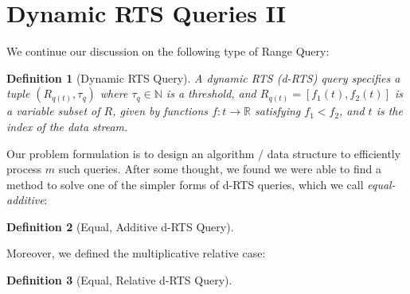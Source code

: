 \documentclass{article}
\newtheorem{definition}{Definition}
\begin{document}
\hspace{95mm}

\section*{Dynamic RTS Queries II}

We continue our discussion on the following type of Range Query: 

\begin{definition}[Dynamic RTS Query] A dynamic RTS (\textit{d-RTS}) query specifies a tuple $(R_{q(t)}, \tau_q)$ where $\tau_q \in \mathbb{N}$
    is a threshold, and $R_{q(t)} =[f_1(t), f_2(t)]$ is a variable subset of $R$, given by functions $f: t\rightarrow\mathbb{R}$ satisfying $f_1 < f_2$, and $t$ is the index of the data stream.
\end{definition}

Our problem formulation is to design an algorithm / data structure to efficiently process $m$ such queries. After some thought, we found we were able to find a method to solve one of the simpler forms of d-RTS queries, which we call \textit{equal-additive}:

\begin{definition}[Equal, Additive d-RTS Query]
    
\end{definition}

Moreover, we defined the multiplicative relative case: 

\begin{definition}[Equal, Relative d-RTS Query]
    
\end{definition}
\end{document}
